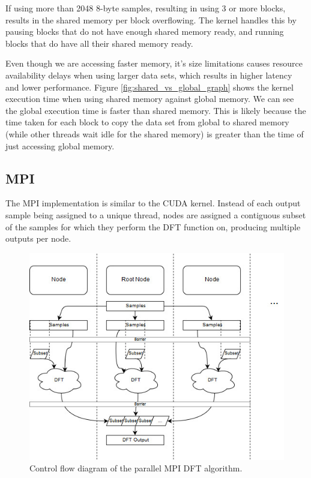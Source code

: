 \documentclass[11pt,a4paper]{article}
\begin{document}
If using more than 2048 8-byte samples, resulting in using 3 or more blocks, results in the shared memory per block overflowing. The kernel handles this by pausing blocks that do not have enough shared memory ready, and running blocks that do have all their shared memory ready.
 
Even though we are accessing faster memory, it's size limitations causes resource availability delays when using larger data sets, which results in higher latency and lower performance. Figure \ref{fig:shared_vs_global_graph} shows the kernel execution time when using shared memory against global memory. We can see the global execution time is faster than shared memory. This is likely because the time taken for each block to copy the data set from global to shared memory (while other threads wait idle for the shared memory) is greater than the time of just accessing global memory.


\subsection{MPI}
The MPI implementation is similar to the CUDA kernel. Instead of each output sample being assigned to a unique thread, nodes are assigned a contiguous subset of the samples for which they perform the DFT function on, producing multiple outputs per node.

\begin{figure}[H]
\begin{center}
\includegraphics[scale=0.5]{mpi_impl1}
\end{center}
\caption{Control flow diagram of the parallel MPI DFT algorithm.}
\label{fig:dft_algorithm}
\end{figure}
\end{document}
